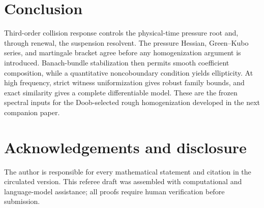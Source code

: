 \documentclass[11pt,reqno]{amsart}
\theoremstyle{definition}
\theoremstyle{remark}
\begin{document}
\section{Conclusion}

Third-order collision response controls the physical-time pressure root and,
through renewal, the suspension resolvent.  The pressure Hessian, Green--Kubo
series, and martingale bracket agree before any homogenization argument is
introduced.  Banach-bundle stabilization then permits smooth coefficient
composition, while a quantitative noncoboundary condition yields ellipticity.
At high frequency, strict witness uniformization gives robust family bounds,
and exact similarity gives a complete differentiable model.  These are the
frozen spectral inputs for the Doob-selected rough homogenization developed in
the next companion paper.

\section*{Acknowledgements and disclosure}
The author is responsible for every mathematical statement and citation in the
circulated version.  This referee draft was assembled with computational and
language-model assistance; all proofs require human verification before
submission.



\end{document}
